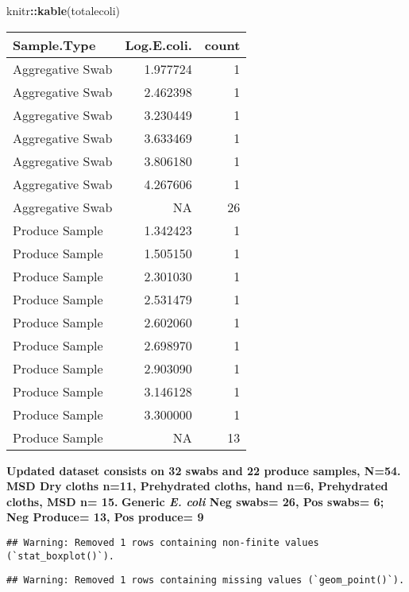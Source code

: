 \documentclass[
]{article}
\newenvironment{Shaded}{\begin{snugshade}}{\end{snugshade}}
\newcommand{\FunctionTok}[1]{\textcolor[rgb]{0.13,0.29,0.53}{\textbf{#1}}}
\newcommand{\NormalTok}[1]{#1}
\newcommand{\SpecialCharTok}[1]{\textcolor[rgb]{0.81,0.36,0.00}{\textbf{#1}}}
\begin{document}
\begin{Shaded}
\begin{Highlighting}[]
\NormalTok{knitr}\SpecialCharTok{::}\FunctionTok{kable}\NormalTok{(totalecoli)}
\end{Highlighting}
\end{Shaded}

\begin{longtable}[]{@{}lrr@{}}
\toprule\noalign{}
Sample.Type & Log.E.coli. & count \\
\midrule\noalign{}
\endhead
\bottomrule\noalign{}
\endlastfoot
Aggregative Swab & 1.977724 & 1 \\
Aggregative Swab & 2.462398 & 1 \\
Aggregative Swab & 3.230449 & 1 \\
Aggregative Swab & 3.633469 & 1 \\
Aggregative Swab & 3.806180 & 1 \\
Aggregative Swab & 4.267606 & 1 \\
Aggregative Swab & NA & 26 \\
Produce Sample & 1.342423 & 1 \\
Produce Sample & 1.505150 & 1 \\
Produce Sample & 2.301030 & 1 \\
Produce Sample & 2.531479 & 1 \\
Produce Sample & 2.602060 & 1 \\
Produce Sample & 2.698970 & 1 \\
Produce Sample & 2.903090 & 1 \\
Produce Sample & 3.146128 & 1 \\
Produce Sample & 3.300000 & 1 \\
Produce Sample & NA & 13 \\
\end{longtable}

\textbf{Updated dataset consists on 32 swabs and 22 produce samples,
N=54. MSD Dry cloths n=11, Prehydrated cloths, hand n=6, Prehydrated
cloths, MSD n= 15.} \textbf{Generic \emph{E. coli} Neg swabs= 26, Pos
swabs= 6; Neg Produce= 13, Pos produce= 9}

\begin{verbatim}
## Warning: Removed 1 rows containing non-finite values (`stat_boxplot()`).
\end{verbatim}

\begin{verbatim}
## Warning: Removed 1 rows containing missing values (`geom_point()`).
\end{verbatim}
\end{document}
